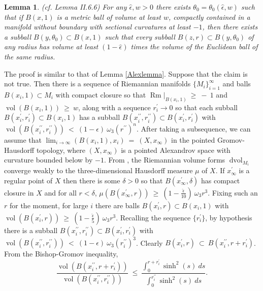 \documentclass[12pt]{amsart}
\newcommand{\dvol}{\operatorname{dvol}}
\newcommand{\Rm}{\operatorname{Rm}}
\newcommand{\vol}{\operatorname{vol}}
\numberwithin{equation}{section}
\theoremstyle{plain}
\newtheorem{lemma}[equation]{Lemma}
\theoremstyle{definition}
\theoremstyle{remark}
\begin{document}
\begin{lemma} \label{Alexlemma2} (cf. Lemma II.6.6)
For any $\widehat{\epsilon}, w>0$ 
there exists $\theta_0 = \theta_0(\widehat{\epsilon},w)$
such that if $B(x,1)$ is a metric ball of volume at least $w$, compactly
contained in a manifold without boundary with sectional
curvatures at least $-1$, then there exists a subball
$B(y,\theta_0) \subset B(x,1)$ such that every subball
$B(z,r) \subset B(y,\theta_0)$ of any radius has volume at
least $(1-\widehat{\epsilon})$ times the volume of the Euclidean ball
of the same radius.
\end{lemma}
The proof is similar to that of Lemma \ref{Alexlemma}.
Suppose that the claim is not true.
Then there is a sequence of Riemannian
manifolds $\{M_i\}_{i=1}^\infty$ and balls $B(x_i, 1)
\subset M_i$ with compact closure
so that $\Rm \Big|_{B(x_i, 1)} \: \ge \: - \: 1$ and
$\vol(B(x_i, 1)) \: \ge \: w$, along with
a sequence $r^\prime_i \rightarrow 0$ so
that each subball
$B(x_i^\prime, r_i^\prime) \subset B(x_i, 1)$ has a subball
$B(x_i^{\prime \prime}, r^{\prime \prime}_i) \subset 
B(x_i^\prime, r_i^\prime)$ 
with $\vol(B(x_i^{\prime \prime}, r_i^{\prime \prime})) \: < \: 
(1 - \widehat{\epsilon}) \: \omega_3 
(r^{\prime \prime})^n$. After taking a subsequence, we can assume that
$\lim_{i \rightarrow \infty} (B(x_i, 1), x_i) \: = \: (X, x_\infty)$ in the
pointed Gromov-Hausdorff topology, where $(X, x_\infty)$ is a pointed
Alexandrov space with curvature bounded below by $-1$. From
\cite[Theorem 10.8]{Burago-Gromov-Perelman}, the Riemannian volume
forms $\dvol_{M_i}$ converge weakly to the three-dimensional Hausdorff
measure $\mu$ of $X$. If $x_\infty^\prime$ is a regular point of
$X$ then there is some $\delta > 0$ so that 
$B(x_\infty^\prime, \delta)$ has compact closure in $X$ and
for all $r < \delta$,
$\mu(B(x_\infty^\prime,
r)) \: \ge \: (1-\frac{\widehat{\epsilon}}{10}) \: \omega_3 r^3$. Fixing 
such an $r$ for the moment,
for large $i$ there are balls
$B(x_i^\prime, r) \subset B(x_i, 1)$
with
$\vol(B(x_i^\prime, r)) \: \ge \: (1-\frac{\widehat{\epsilon}}{5}) \: \omega_3 
r^3$.
Recalling the sequence $\{r^\prime_i\}$,
by hypothesis there is a subball
$B(x_i^{\prime \prime}, 
r_i^{\prime \prime}) \subset B(x_i^\prime, r_i^\prime)$ with
$\vol(B(x_i^{\prime \prime}, r_i^{\prime \prime})) \: < \: 
(1 - \widehat{\epsilon}) \: \omega_3 
(r_i^{\prime \prime})^3$. 
Clearly
$B(x_i^\prime,
r) \: \subset \: B(x_i^{\prime \prime}, r + r_i^\prime)$.
From the Bishop-Gromov inequality,
\begin{equation}
\frac{\vol(B(x_i^{\prime \prime}, r + r_i^\prime))}{\vol(B(x_i^{\prime \prime},
r_i^{\prime \prime}))} \: \le \:
\frac{\int_0^{r + r_i^\prime} \sinh^2(s) \: 
ds}{\int_0^{r_i^{\prime \prime}} \sinh^2(s) \: ds}.
\end{equation}
\end{document}

